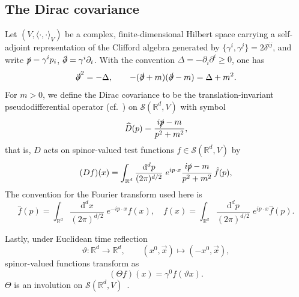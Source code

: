 \documentclass[10pt,a4paper,oneside,reqno]{amsart}
\newcommand{\reals}{\mathbb{R}}
\newcommand{\Dirac}{D}
\begin{document}
\subsection{The Dirac covariance}
Let $(V, \langle\cdot,\cdot\rangle_V)$ be a complex, finite-dimensional Hilbert space carrying a self-adjoint representation of the Clifford algebra generated by $\{\gamma^i, \gamma^j\}=2\delta^{ij}$, and write $\slashed{p} = \gamma^i p_i$, $\slashed{\partial} = \gamma^i \partial_i$. With the convention $\Delta=-\partial_i\partial^i\geq 0$, one has
\begin{equation}
\slashed\partial^2=-\Delta,
\qquad
-(\slashed\partial+m)(\slashed\partial-m)=\Delta+m^2 .
\end{equation}
For $m>0$, we define the Dirac covariance to be the translation-invariant pseudodifferential operator (cf.~\cite[Ch.~XVIII]{Hormander2007AnalysisIII}) on \(\mathcal S(\mathbb R^d,V)\) with symbol
\begin{equation}
\widehat \Dirac(p)=\frac{i\slashed p-m}{p^2+m^2},
\end{equation}
that is, $\Dirac$ acts on spinor-valued test functions $f\in \mathcal{S}(\mathbb R^d,V)$ by
\begin{equation}
    (\Dirac f)(x) = \int_{\reals^{d}}\frac{\mathrm{d}^{d} p}{(2\pi)^{d/2}} \;e^{ip\cdot x}\frac{i\slashed p-m}{p^2+m^2}\, \hat{f}(p),
\end{equation}
The convention for the Fourier transform used here is
\begin{equation}
    \hat{f}(p) = \int_{\reals^{d}}\frac{\mathrm{d}^{d} x}{(2\pi)^{d/2}} \;e^{-ip\cdot x} f(x), \quad f(x) = \int_{\reals^{d}}\frac{\mathrm{d}^{d} p}{(2\pi)^{d/2}} \;e^{ip\cdot x} \hat{f}(p).
\end{equation}

Lastly, under Euclidean time reflection
\begin{equation}
    \vartheta: \mathbb{R}^d \to \mathbb{R}^d, \qquad (x^0, \vec{x}) \mapsto (-x^0, \vec{x}),
\end{equation}
spinor-valued functions transform as 
\begin{equation}
    (\Theta f)(x) = \gamma^0 f(\vartheta x). 
\end{equation} $\Theta$ is an involution on $\mathcal{S}(\reals^d,V) $~\cite{Jaffe2008ReflectionMonotonicity}.
\end{document}
